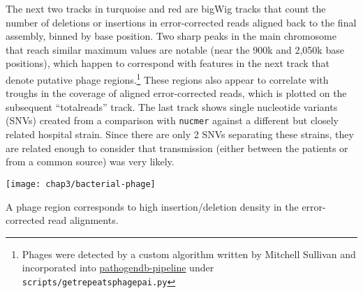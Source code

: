 The next two tracks in turquoise and red are bigWig tracks that count the number of deletions or insertions in error-corrected reads aligned back to the final assembly, binned by base position. Two sharp peaks in the main chromosome that reach similar maximum values are notable (near the 900k and 2,050k base positions), which happen to correspond with features in the next track that denote putative phage regions.\footnote{Phages were detected by a custom algorithm written by Mitchell Sullivan and incorporated into \href{https://github.com/powerpak/pathogendb-pipeline}{pathogendb-pipeline} under \texttt{scripts/get\textunderscore repeats\textunderscore phage\textunderscore pai.py}} These regions also appear to correlate with troughs in the coverage of  aligned error-corrected reads, which is plotted on the subsequent ``total\textunderscore reads'' track. The last track shows single nucleotide variants (SNVs) created from a comparison with \texttt{nucmer}\autocite{Delcher2003} against a different but closely related hospital strain. Since there are only 2 SNVs separating these strains, they are related enough to consider that transmission (either between the patients or from a common source) was very likely.

\begin{marginfigure}
  \texttt{[image: chap3/bacterial-phage]}               
  \caption[A phage region corresponds to high insertion/deletion density]{A phage region corresponds to high insertion/deletion density in the error-corrected read alignments.}
  \label{fig:bacterial_phage}
\end{marginfigure}

